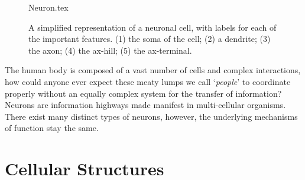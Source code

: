 \documentclass[../../Orator]{subfiles}
\begin{document}
\begin{figure}[h]
    \centering
    {Neuron.tex}
    \caption{A simplified representation of a neuronal cell, with labels for each of the important features. (1) the \gls{soma} of the cell; (2) a \gls{dendrite}; (3) the \gls{axon}; (4) the \gls{ax-hill}; (5) the \gls{ax-terminal}.}\label{fig:Neuron}
\end{figure}

The human body is composed of a vast number of cells and complex interactions, how could anyone ever expect these meaty lumps we call `\textit{people}' to coordinate properly without an equally complex system for the transfer of information? 
Neurons are information highways made manifest in multi-cellular organisms. 
There exist many distinct types of neurons, however, the underlying mechanisms of function stay the same.


\section{Cellular Structures}

\begin{comment}
    \subsection{Organelles}
    {\noindent
    Nucleus \\
    Ribosomes \\
    Golgi-Apparatus \\
    Endoplasmic Reticulum, rough \& smooth \\
    Lysosome
    }
\end{comment}
\end{document}
